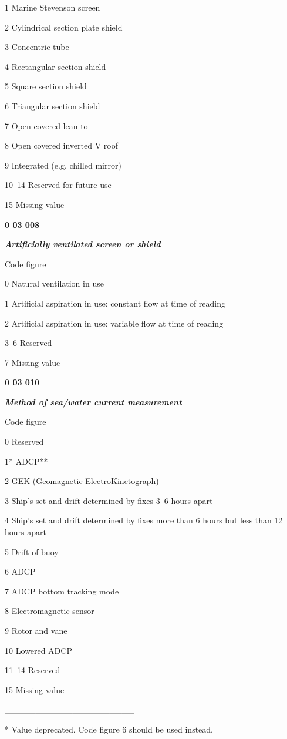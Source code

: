 1 Marine Stevenson screen

2 Cylindrical section plate shield

3 Concentric tube

4 Rectangular section shield

5 Square section shield

6 Triangular section shield

7 Open covered lean-to

8 Open covered inverted V roof

9 Integrated (e.g. chilled mirror)

10--14 Reserved for future use

15 Missing value

\textbf{0 03 008}

\emph{\textbf{Artificially ventilated screen or shield}}

Code figure

0 Natural ventilation in use

1 Artificial aspiration in use: constant flow at time of reading

2 Artificial aspiration in use: variable flow at time of reading

3--6 Reserved

7 Missing value

\textbf{0 03 010}

\emph{\textbf{Method of sea/water current measurement}}

Code figure

0 Reserved

1* ADCP**

2 GEK (Geomagnetic ElectroKinetograph)

3 Ship's set and drift determined by fixes 3--6 hours apart

4 Ship's set and drift determined by fixes more than 6 hours but less than 12 hours apart

5 Drift of buoy

6 ADCP

7 ADCP bottom tracking mode

8 Electromagnetic sensor

9 Rotor and vane

10 Lowered ADCP

11--14 Reserved

15 Missing value

\_\_\_\_\_\_\_\_\_\_\_\_\_\_\_\_\_\_\_\_\_

* Value deprecated. Code figure 6 should be used instead.

